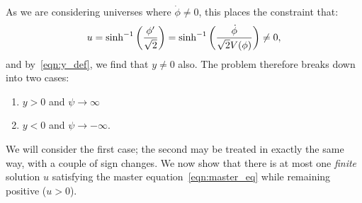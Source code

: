 As we are considering universes where \(\dot{\phi}\ne 0\), this places the constraint that:
%
\begin{equation}
  u 
  = 
  \sinh^{-1}\left(\frac{{{\phi}^\prime}}{\sqrt 2}\right) 
  = 
  \sinh^{-1}\left(\frac{\dot\phi}{\sqrt 2 V(\phi)}\right)
  \ne 
  0,
\end{equation}
%
and by~\eqref{eqn:y_def}, we find that \(y\ne0\) also.  The problem therefore breaks down into two cases: 
%
\begin{enumerate}
  \item \(y>0\) and \(\psi\rightarrow\infty\)
  \item \(y<0\) and \(\psi\rightarrow -\infty\).
\end{enumerate}
%
We will consider the first case; the second may be treated in exactly the same way, with a couple of sign changes.  We now show that there is at most one {\em finite\/} solution \(u\) satisfying the master equation~\eqref{eqn:master_eq} while remaining positive (\(u>0\)).


